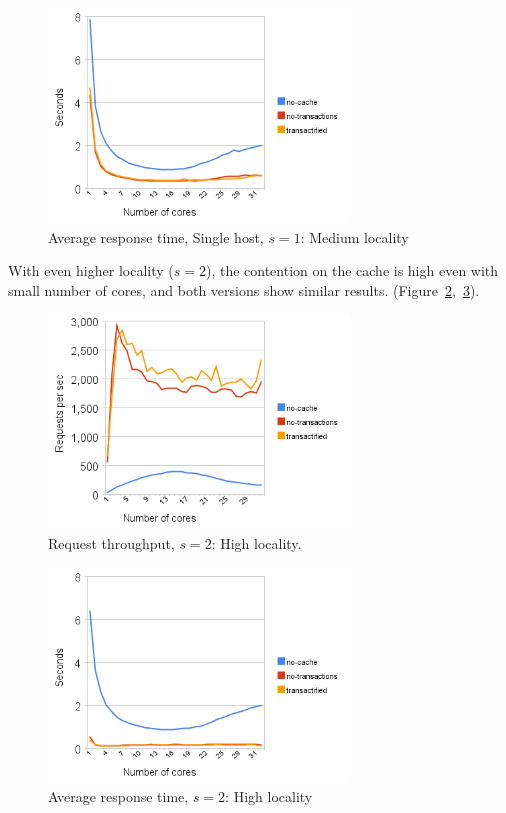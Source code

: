 \documentclass[preprint,11pt]{sigplanconf}
\begin{document}
\begin{figure}
 \begin{center}
  \includegraphics[width=8cm]{response-time-single-host-1.png}
 \end{center}
 \caption{Average response time, Single host, $s = 1$: Medium locality}
 \label{fig:response-time-single-host-1}
\end{figure}

With even higher locality ($s=2$), the contention on the cache is high even with
small number of cores, and both versions show similar results.
(Figure~\ref{fig:request-throughput-2},~\ref{fig:response-time-2}).

\begin{figure}
 \begin{center}
  \includegraphics[width=8cm]{transaction-rate-client-server-2.png}
 \end{center}
 \caption{Request throughput, $s = 2$: High locality.}
 \label{fig:request-throughput-2}
\end{figure}
\begin{figure}
 \begin{center}
  \includegraphics[width=8cm]{response-time-client-server-2.png}
 \end{center}
 \caption{Average response time, $s = 2$: High locality}
 \label{fig:response-time-2}
\end{figure}
\end{document}
